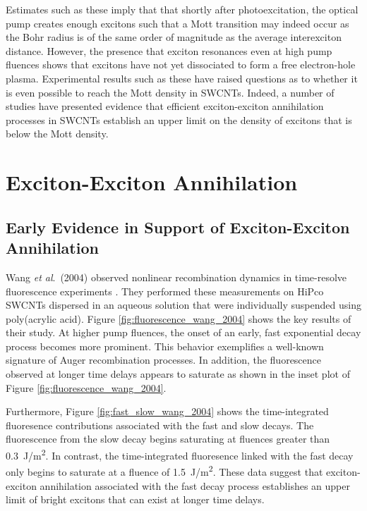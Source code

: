 Estimates such as these imply that that shortly after photoexcitation, the optical pump creates enough excitons such that a Mott transition may indeed occur as the Bohr radius is of the same order of magnitude as the average interexciton distance. However, the presence that exciton resonances even at high pump fluences shows that excitons have not yet dissociated to form a free electron-hole plasma. Experimental results such as these have raised questions as to whether it is even possible to reach the Mott density in SWCNTs. Indeed, a number of studies have presented evidence that efficient exciton-exciton annihilation processes in SWCNTs establish an upper limit on the density of excitons that is below the Mott density.


\section{Exciton-Exciton Annihilation}

\subsection{Early Evidence in Support of Exciton-Exciton Annihilation}

Wang \textit{et al}.\ (2004) observed nonlinear recombination dynamics in time-resolve fluorescence experiments \cite{wang2004observation}. They performed these measurements on HiPco SWCNTs dispersed in an aqueous solution that were individually suspended using poly(acrylic acid). Figure \ref{fig:fluorescence_wang_2004} shows the key results of their study. At higher pump fluences, the onset of an early, fast exponential decay process becomes more prominent. This behavior exemplifies a well-known signature of Auger recombination processes. In addition, the fluorescence observed at longer time delays appears to saturate as shown in the inset plot of Figure \ref{fig:fluorescence_wang_2004}.

Furthermore, Figure \ref{fig:fast_slow_wang_2004} shows the time-integrated fluoresence contributions associated with the fast and slow decays. The fluorescence from the slow decay begins saturating at fluences greater than \SI{0.3}{\joule / \meter\squared}. In contrast, the time-integrated fluoresence linked with the fast decay only begins to saturate at a fluence of \SI{1.5}{\joule / \meter\squared}. These data suggest that exciton-exciton annihilation associated with the fast decay process establishes an upper limit of bright excitons that can exist at longer time delays.

